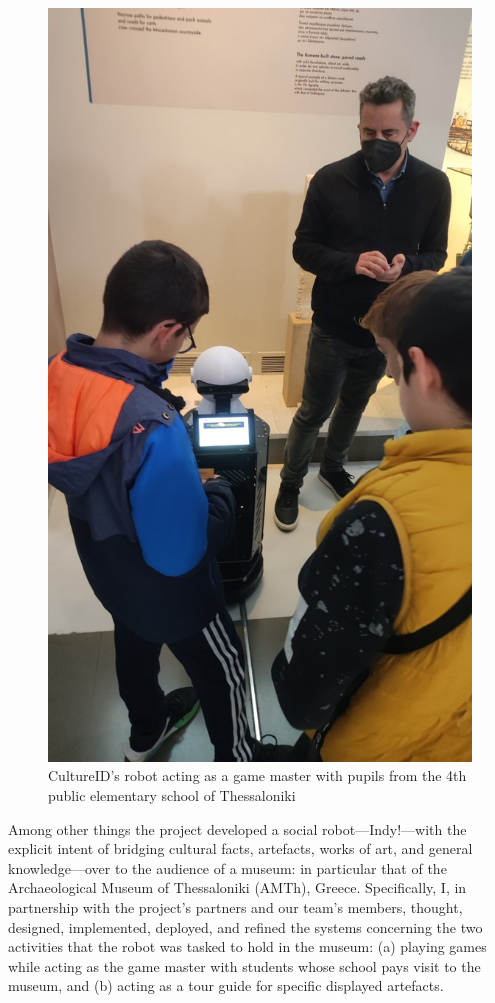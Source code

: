 \begin{figure}[H]\centering
  \includegraphics[scale=0.2]{images/cultureid/indy_at_museum.jpg}
  \caption{\small CultureID's robot acting as a game master with pupils from
           the 4th public elementary school of Thessaloniki}
  \label{fig:cultureid_indy}
\end{figure}

Among other things the project developed a social robot---Indy!---with the
explicit intent of bridging cultural facts, artefacts, works of art, and
general knowledge---over to the audience of a museum: in particular that of the
Archaeological Museum of Thessaloniki (AMTh), Greece. Specifically, I, in
partnership with the project's partners and our team's members, thought,
designed, implemented, deployed, and refined the systems concerning the two
activities that the robot was tasked to hold in the museum: (a) playing games
while acting as the game master with students whose school pays visit to the
museum, and (b) acting as a tour guide for specific displayed artefacts.


